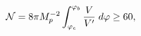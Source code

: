 \begin{equation} \label{e-fold}
{\cal{N}}=8\pi M^{-2}_{p} \int_{\varphi_{e}}^{\varphi_{b}}
\frac{V}{V^{\prime}} \; d\varphi \geq 60,
\end{equation}

